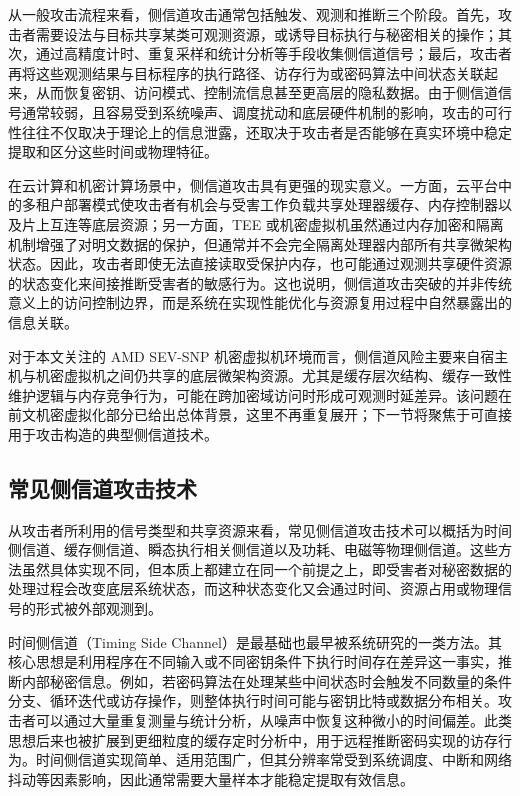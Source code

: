 从一般攻击流程来看，侧信道攻击通常包括触发、观测和推断三个阶段。首先，攻击者需要设法与目标共享某类可观测资源，或诱导目标执行与秘密相关的操作；其次，通过高精度计时、重复采样和统计分析等手段收集侧信道信号；最后，攻击者再将这些观测结果与目标程序的执行路径、访存行为或密码算法中间状态关联起来，从而恢复密钥、访问模式、控制流信息甚至更高层的隐私数据\cite{kocher1996timing,ge2018survey}。由于侧信道信号通常较弱，且容易受到系统噪声、调度扰动和底层硬件机制的影响，攻击的可行性往往不仅取决于理论上的信息泄露，还取决于攻击者是否能够在真实环境中稳定提取和区分这些时间或物理特征。

在云计算和机密计算场景中，侧信道攻击具有更强的现实意义。一方面，云平台中的多租户部署模式使攻击者有机会与受害工作负载共享处理器缓存、内存控制器以及片上互连等底层资源；另一方面，TEE 或机密虚拟机虽然通过内存加密和隔离机制增强了对明文数据的保护，但通常并不会完全隔离处理器内部所有共享微架构状态\cite{lou2022survey,confidentialcomputingconsortium2022}。因此，攻击者即使无法直接读取受保护内存，也可能通过观测共享硬件资源的状态变化来间接推断受害者的敏感行为。这也说明，侧信道攻击突破的并非传统意义上的访问控制边界，而是系统在实现性能优化与资源复用过程中自然暴露出的信息关联。

对于本文关注的 AMD SEV-SNP 机密虚拟机环境而言，侧信道风险主要来自宿主机与机密虚拟机之间仍共享的底层微架构资源。尤其是缓存层次结构、缓存一致性维护逻辑与内存竞争行为，可能在跨加密域访问时形成可观测时延差异。该问题在前文机密虚拟化部分已给出总体背景，这里不再重复展开；下一节将聚焦于可直接用于攻击构造的典型侧信道技术。

\subsection{常见侧信道攻击技术}
从攻击者所利用的信号类型和共享资源来看，常见侧信道攻击技术可以概括为时间侧信道、缓存侧信道、瞬态执行相关侧信道以及功耗、电磁等物理侧信道。这些方法虽然具体实现不同，但本质上都建立在同一个前提之上，即受害者对秘密数据的处理过程会改变底层系统状态，而这种状态变化又会通过时间、资源占用或物理信号的形式被外部观测到。

时间侧信道（Timing Side Channel）是最基础也最早被系统研究的一类方法。其核心思想是利用程序在不同输入或不同密钥条件下执行时间存在差异这一事实，推断内部秘密信息\cite{kocher1996timing}。例如，若密码算法在处理某些中间状态时会触发不同数量的条件分支、循环迭代或访存操作，则整体执行时间可能与密钥比特或数据分布相关。攻击者可以通过大量重复测量与统计分析，从噪声中恢复这种微小的时间偏差。此类思想后来也被扩展到更细粒度的缓存定时分析中，用于远程推断密码实现的访存行为\cite{Bernstein2005CachetimingAO}。时间侧信道实现简单、适用范围广，但其分辨率常受到系统调度、中断和网络抖动等因素影响，因此通常需要大量样本才能稳定提取有效信息。

